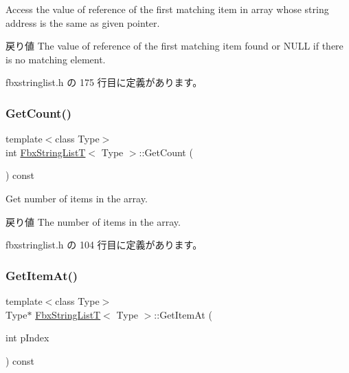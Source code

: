 Access the value of reference of the first matching item in array whose string address is the same as given pointer. \begin{DoxyReturn}{戻り値}
The value of reference of the first matching item found or N\+U\+LL if there is no matching element. 
\end{DoxyReturn}


 fbxstringlist.\+h の 175 行目に定義があります。

\mbox{\label{class_fbx_string_list_t_a4b881e2791c4b9a8b1abf5c845c3ddb1}} 
\subsubsection{\texorpdfstring{Get\+Count()}{GetCount()}}
{\footnotesize\ttfamily template$<$class Type$>$ \\
int \hyperlink{class_fbx_string_list_t}{Fbx\+String\+ListT}$<$ Type $>$\+::Get\+Count (\begin{DoxyParamCaption}{ }\end{DoxyParamCaption}) const\hspace{0.3cm}{\ttfamily [inline]}}

Get number of items in the array. \begin{DoxyReturn}{戻り値}
The number of items in the array. 
\end{DoxyReturn}


 fbxstringlist.\+h の 104 行目に定義があります。

\mbox{\label{class_fbx_string_list_t_a86ee3c651fea2cb1fe50896bc93ef685}} 
\subsubsection{\texorpdfstring{Get\+Item\+At()}{GetItemAt()}}
{\footnotesize\ttfamily template$<$class Type$>$ \\
Type$\ast$ \hyperlink{class_fbx_string_list_t}{Fbx\+String\+ListT}$<$ Type $>$\+::Get\+Item\+At (\begin{DoxyParamCaption}\item[{int}]{p\+Index }\end{DoxyParamCaption}) const\hspace{0.3cm}{\ttfamily [inline]}}



